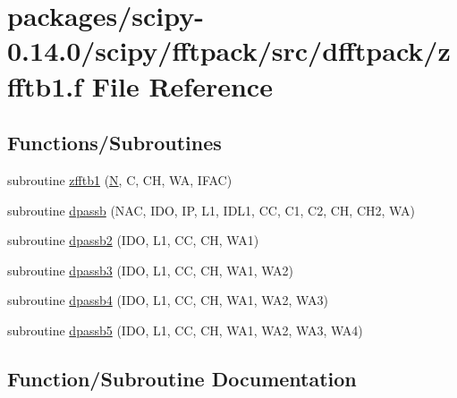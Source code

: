\hypertarget{zfftb1_8f}{}\section{packages/scipy-\/0.14.0/scipy/fftpack/src/dfftpack/zfftb1.f File Reference}
\label{zfftb1_8f}
\subsection*{Functions/\+Subroutines}
\begin{DoxyCompactItemize}
\item 
subroutine \hyperlink{zfftb1_8f_aff584ac67bf8268a1d0c3fee72d367c6}{zfftb1} (\hyperlink{polmisc_8c_a0240ac851181b84ac374872dc5434ee4}{N}, C, C\+H, W\+A, I\+F\+A\+C)
\item 
subroutine \hyperlink{zfftb1_8f_abd8cfee65d3b5823091e39a826f9ca7d}{dpassb} (N\+A\+C, I\+D\+O, I\+P, L1, I\+D\+L1, C\+C, C1, C2, C\+H, C\+H2, W\+A)
\item 
subroutine \hyperlink{zfftb1_8f_aa6cbe100966bd2d370be4739c8586006}{dpassb2} (I\+D\+O, L1, C\+C, C\+H, W\+A1)
\item 
subroutine \hyperlink{zfftb1_8f_a6cc5e5b8675ed44769f851b0ab830557}{dpassb3} (I\+D\+O, L1, C\+C, C\+H, W\+A1, W\+A2)
\item 
subroutine \hyperlink{zfftb1_8f_a78a5fca1f23c6c8ce3a3efee56506a7d}{dpassb4} (I\+D\+O, L1, C\+C, C\+H, W\+A1, W\+A2, W\+A3)
\item 
subroutine \hyperlink{zfftb1_8f_a7797be856880c746f6acee47856b45a7}{dpassb5} (I\+D\+O, L1, C\+C, C\+H, W\+A1, W\+A2, W\+A3, W\+A4)
\end{DoxyCompactItemize}


\subsection{Function/\+Subroutine Documentation}
\hypertarget{zfftb1_8f_abd8cfee65d3b5823091e39a826f9ca7d}{}
